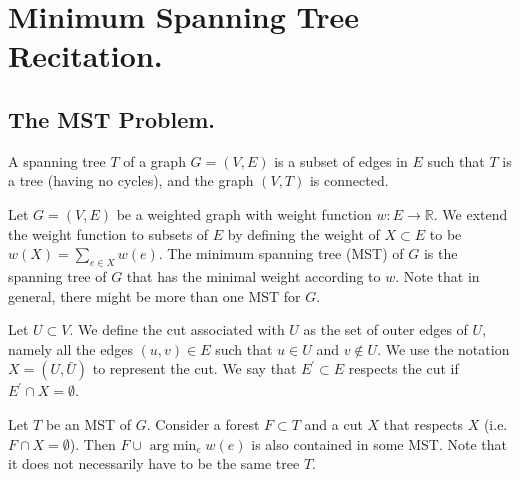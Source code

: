 


\ifdefined\BOOK
\else
\setcounter{chapter}{10}
\fi
\chapter{Minimum Spanning Tree Recitation.} 


\section{The MST Problem.}

\begin{definition}
  A spanning tree $T$ of a graph $G=(V,E)$ is a subset of edges in $E$ such that $T$ is a tree (having no cycles), and the graph $(V,T)$ is connected.   
\end{definition}

\begin{problem}[MST] Let $G = (V,E)$ be a weighted graph with weight function $w : E \rightarrow \mathbb{R}$. We extend the weight function to subsets of $E$ by defining the weight of $X\subset E$ to be $w(X)= \sum_{e \in X}w(e)$. The minimum spanning tree (MST) of $G$ is the spanning tree of $G$ that has the minimal weight according to $w$. Note that in general, there might be more than one MST for $G$. 
\end{problem}

\begin{definition}
  \label{def:cut}
  Let $U \subset V$. We define the cut associated with $U$ as the set of outer edges of $U$, namely all the edges $(u,v)\in E$ such that $u\in U$ and $v \notin U$. We use the notation $X = (U, \bar{U})$ to represent the cut. We say that $E^{\prime} \subset E$ respects the cut if $E^{\prime} \cap X = \emptyset$.
\end{definition} 

\begin{lemma} 
  \label{lemma:cut}
  Let $T$ be an MST of $G$. Consider a forest $F \subset T$ and a cut $X$ that respects $X$ (i.e. $F \cap X = \emptyset$). Then $F \cup \text{ arg}\min_{e} w(e)$ is also contained in some MST. Note that it does not necessarily have to be the same tree $T$. 
\end{lemma}


